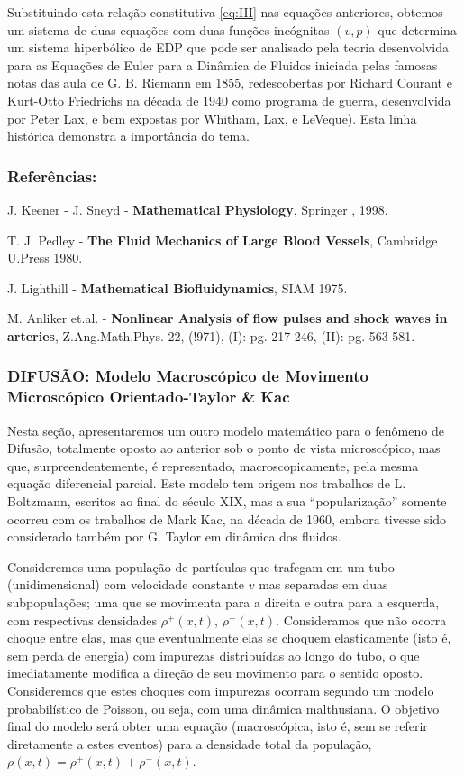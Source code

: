 Substituindo esta relação constitutiva \eqref{eq:III} nas equações anteriores, obtemos um sistema de duas equações com duas funções incógnitas \((v, p)\) que determina um sistema hiperbólico de EDP que pode ser analisado pela teoria desenvolvida para as Equações de Euler para a Dinâmica de Fluidos iniciada pelas famosas notas das aula de G. B. Riemann em 1855, redescobertas por Richard Courant e Kurt-Otto Friedrichs na década de 1940 como programa de guerra, desenvolvida por Peter Lax, e bem expostas por Whitham, Lax, e LeVeque). Esta linha histórica demonstra a importância do tema.

\subsubsection{Referências:}

J. Keener - J. Sneyd - \textbf{Mathematical Physiology}, Springer , 1998.

T. J. Pedley - \textbf{The Fluid Mechanics of Large Blood Vessels}, Cambridge U.Press 1980.

J. Lighthill - \textbf{Mathematical Biofluidynamics}, SIAM 1975.

M. Anliker et.al. - \textbf{Nonlinear Analysis of flow pulses and shock waves in arteries}, Z.Ang.Math.Phys. 22, (!971), (I): pg. 217-246, (II): pg. 563-581.


\subsubsection{DIFUSÃO: Modelo Macroscópico de Movimento Microscópico Orientado-Taylor \& Kac}

Nesta seção, apresentaremos um outro modelo matemático para o fenômeno de Difusão, totalmente oposto ao anterior sob o ponto de vista microscópico, mas que, surpreendentemente, é representado, macroscopicamente, pela mesma equação diferencial parcial. Este modelo tem origem nos trabalhos de L. Boltzmann, escritos ao final do século XIX, mas a sua ``popularização'' somente ocorreu com os trabalhos de Mark Kac, na década de 1960, embora tivesse sido considerado também por G. Taylor em dinâmica dos fluidos.

Consideremos uma população de partículas que trafegam em um tubo (unidimensional) com velocidade constante \(v\) mas separadas em duas subpopulações; uma que se movimenta para a direita e outra para a esquerda, com respectivas densidades \(\rho^+(x,t)\), \(\rho^-(x,t)\). Consideramos que não ocorra choque entre elas, mas que eventualmente elas se choquem elasticamente (isto é, sem perda de energia) com impurezas distribuídas ao longo do tubo, o que imediatamente modifica a direção de seu movimento para o sentido oposto. Consideremos que estes choques com impurezas ocorram segundo um modelo probabilístico de Poisson, ou seja, com uma dinâmica malthusiana. O objetivo final do modelo será obter uma equação (macroscópica, isto é, sem se referir diretamente a estes eventos) para a densidade total da população, \(\rho(x,t) = \rho^+(x,t) + \rho^-(x,t)\). 

